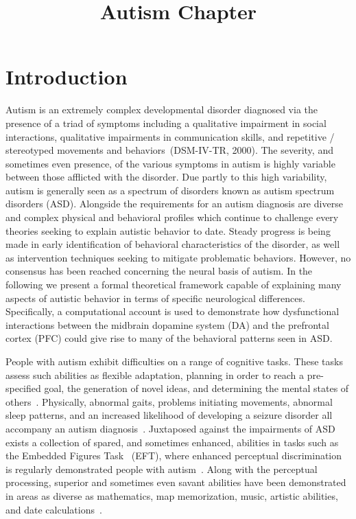 \documentclass[man]{apa}
\title{Autism Chapter}
\begin{document}
\maketitle 

\section{Introduction}

	Autism is an extremely complex developmental disorder diagnosed via the presence of a triad of symptoms including a qualitative impairment in social interactions, qualitative impairments in communication skills, and repetitive / stereotyped movements and behaviors~\nocite{RefWorks:98}(DSM-IV-TR, 2000).  The severity, and sometimes even presence, of the various symptoms in autism is highly variable between those afflicted with the disorder.  Due partly to this high variability, autism is generally seen as a spectrum of disorders known as autism spectrum disorders (ASD).  Alongside the requirements for an autism diagnosis are diverse and complex physical and behavioral profiles which continue to challenge every theories seeking to explain autistic behavior to date.  Steady progress is being made in early identification of behavioral characteristics of the disorder, as well as intervention techniques seeking to mitigate problematic behaviors.  However, no consensus has been reached concerning the neural basis of autism.  In the following we present a formal theoretical framework capable of explaining many aspects of autistic behavior in terms of specific neurological differences.  Specifically, a computational account is used to demonstrate how dysfunctional interactions between the midbrain dopamine system (DA) and the prefrontal cortex (PFC) could give rise to many of the behavioral patterns seen in ASD.

People with autism exhibit difficulties on a range of cognitive tasks.  These tasks assess such abilities as flexible adaptation, planning in order to reach a pre-specified goal, the generation of novel ideas, and determining the mental states of others~\cite{BennettoL:1996:AutismPlanningWCST,Ozonoff:1999:AutismStroopWCST,TurnerW:1999:AutismGenerativity,Baron-Cohen:1985:AutismTOM}.  Physically, abnormal gaits, problems initiating movements, abnormal sleep patterns, and an increased likelihood of developing a seizure disorder all accompany an autism diagnosis~\cite{RefWorks:99,RefWorks:100,RefWorks:101,RefWorks:102}.  Juxtaposed against the impairments of ASD exists a collection of spared, and sometimes enhanced, abilities in tasks such as the Embedded Figures Task~\cite{WitkinHA:1971:EFT} (EFT), where enhanced perceptual discrimination is regularly demonstrated people with autism~\cite{RefWorks:103,RefWorks:104}.  Along with the perceptual processing, superior and sometimes even savant abilities have been demonstrated in areas as diverse as mathematics, map memorization, music, artistic abilities, and date calculations~\cite{RefWorks:105,RefWorks:106,RefWorks:107,RefWorks:37}.   
\end{document}
